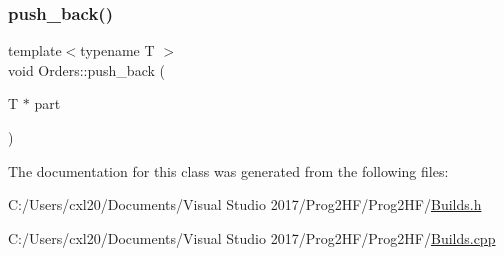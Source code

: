 \mbox{\label{class_orders_a678969b0e57fd41f4ab0cc949d4500f6}} 
\subsubsection{\texorpdfstring{push\_back()}{push\_back()}}
{\footnotesize\ttfamily template$<$typename T $>$ \\
void Orders\+::push\+\_\+back (\begin{DoxyParamCaption}\item[{T $\ast$}]{part }\end{DoxyParamCaption})}



The documentation for this class was generated from the following files\+:\begin{DoxyCompactItemize}
\item 
C\+:/\+Users/cxl20/\+Documents/\+Visual Studio 2017/\+Prog2\+H\+F/\+Prog2\+H\+F/\mbox{\hyperlink{_builds_8h}{Builds.\+h}}\item 
C\+:/\+Users/cxl20/\+Documents/\+Visual Studio 2017/\+Prog2\+H\+F/\+Prog2\+H\+F/\mbox{\hyperlink{_builds_8cpp}{Builds.\+cpp}}\end{DoxyCompactItemize}
